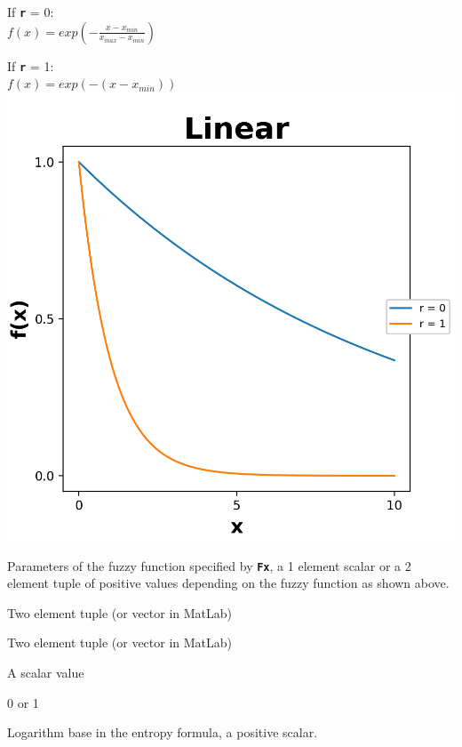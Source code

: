 \documentclass[12pt, a4paper, titlepage, openany]{book}
\begin{document}
\begin{description}[labelsep=1cm, labelwidth=2cm, nosep,style=multiline,leftmargin=3cm]
\begin{description}[labelsep=14em, labelwidth=10em, nosep,style=multiline,leftmargin=6cm]
	\item[\texttt{"linear"}]	If \texttt{\textbf{r}} = 0: \\
	$f(x) = exp(-\frac{x - x_{min}}{x_{max} - x_{min}}) $
	\item[]			If \texttt{\textbf{r}} = 1: \\ $f(x) = exp(-(x - x_{min}))$\\
		\includegraphics[scale=.5]{Fuzz4.png}
	\end{description}	
\item[\texttt{r}]	Parameters of the fuzzy function specified by \textbf{\texttt{Fx}}, a 1 element scalar or a 2 element tuple of positive values depending on the fuzzy function as shown above.
	\begin{description}[labelsep=14em, labelwidth=10em, nosep,style=multiline,leftmargin=3cm]
	\item[\texttt{\emph{Default}}]		Two element tuple (or vector in MatLab)
	\item[\texttt{\emph{Sigmoid/ModSampEn}}]		Two element tuple (or vector in MatLab)
	\item[\texttt{\emph{Gudermannian}}] A scalar value
	\item[\texttt{\emph{Linear}}]		0 or 1
	\end{description}

\item[\texttt{Logx}]	Logarithm base in the entropy formula, a positive scalar.
\end{description}
\end{document}
